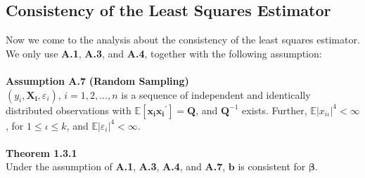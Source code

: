 \documentclass{article}
\begin{document}
\subsection{Consistency of the Least Squares Estimator}
Now we come to the analysis about the consistency of the least squares estimator. We only use \textbf{A.1}, \textbf{A.3}, and \textbf{A.4}, together with the following assumption:\\\\
\textbf{Assumption A.7} \textbf{(Random Sampling)}\\
$(y_i, \boldsymbol{X_i}, \varepsilon_i)$, $i = 1, 2, \ldots, n$ is a sequence of independent and identically distributed observations with $\mathbb{E}[\boldsymbol{x_i} \boldsymbol{x_i}^\prime] = \boldsymbol{Q}$, and $\boldsymbol{Q}^{-1}$ exists. Further, $\mathbb{E}|x_{i\iota}|^4 < \infty$, for $1 \leq \iota \leq k$, and $\mathbb{E}|\varepsilon_i|^4 < \infty$.\\\\
\textbf{Theorem 1.3.1}\\
Under the assumption of \textbf{A.1}, \textbf{A.3}, \textbf{A.4}, and \textbf{A.7}, $\boldsymbol{b}$ is consistent for $\boldsymbol{\beta}$.
\end{document}
